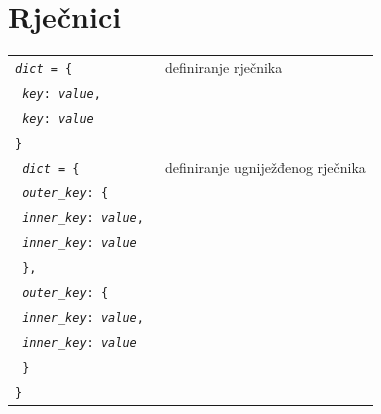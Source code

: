 \documentclass[10pt]{article}
\begin{document}
    \section*{\color{NavyBlue} Rječnici}
    \begin{tabular}{|>{\tt}p{9.00cm}|>{}p{15.50cm}|}
        \hline
        \textit{dict} = \{ & definiranje rječnika
            \\
            \hspace{10pt} \textit{key}: \textit{value},
            \\
            \hspace{10pt} \textit{key}: \textit{value}
            \\
        \}
        \\ \hline
        \textit{dict} = \{ & definiranje ugniježđenog rječnika \\
            \hspace{10pt} \textit{outer\_key}: \{
            \\
            \hspace{10pt} \hspace{10pt} \textit{inner\_key}: \textit{value},
            \\
            \hspace{10pt} \hspace{10pt} \textit{inner\_key}: \textit{value}
            \\
            \hspace{10pt} \},
            \\
            \hspace{10pt} \textit{outer\_key}: \{ \\
            \hspace{10pt} \hspace{10pt} \textit{inner\_key}: \textit{value},
            \\
            \hspace{10pt} \hspace{10pt} \textit{inner\_key}: \textit{value}
            \\
            \hspace{10pt} \}
            \\
            \}
        \\ \hline
    \end{tabular}
\end{document}
